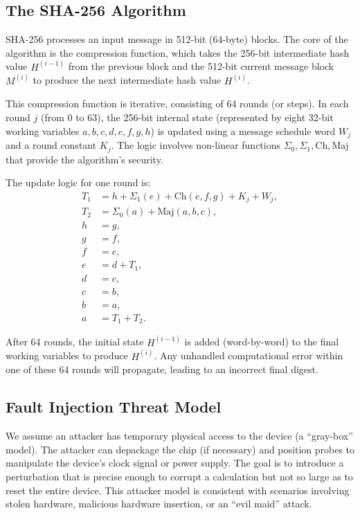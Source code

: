 \documentclass[11pt, a4paper]{article}
\begin{document}
\subsection{The SHA-256 Algorithm}
SHA-256 processes an input message in 512-bit (64-byte) blocks. The core of the algorithm is the compression function, which takes the 256-bit intermediate hash value $H^{(i-1)}$ from the previous block and the 512-bit current message block $M^{(i)}$ to produce the next intermediate hash value $H^{(i)}$.

This compression function is iterative, consisting of 64 rounds (or steps). In each round $j$ (from 0 to 63), the 256-bit internal state (represented by eight 32-bit working variables $a, b, c, d, e, f, g, h$) is updated using a message schedule word $W_j$ and a round constant $K_j$. The logic involves non-linear functions $\Sigma_0, \Sigma_1, \text{Ch}, \text{Maj}$ that provide the algorithm's security.

The update logic for one round is:
\begin{align*}
    T_1 &= h + \Sigma_1(e) + \text{Ch}(e, f, g) + K_j + W_j, \\
    T_2 &= \Sigma_0(a) + \text{Maj}(a, b, c), \\
    h &= g, \\
    g &= f, \\
    f &= e, \\
    e &= d + T_1, \\
    d &= c, \\
    c &= b, \\
    b &= a, \\
    a &= T_1 + T_2.
\end{align*}

After 64 rounds, the initial state $H^{(i-1)}$ is added (word-by-word) to the final working variables to produce $H^{(i)}$. Any unhandled computational error within one of these 64 rounds will propagate, leading to an incorrect final digest.

\subsection{Fault Injection Threat Model}
We assume an attacker has temporary physical access to the device (a ``gray-box'' model). The attacker can depackage the chip (if necessary) and position probes to manipulate the device's clock signal or power supply. The goal is to introduce a perturbation that is precise enough to corrupt a calculation but not so large as to reset the entire device. This attacker model is consistent with scenarios involving stolen hardware, malicious hardware insertion, or an ``evil maid'' attack.
\end{document}
